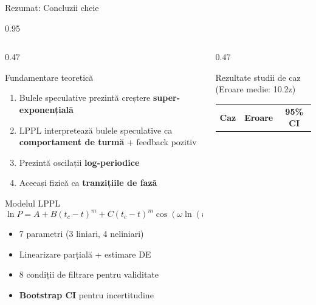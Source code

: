 \documentclass[9pt, aspectratio=169, t]{beamer}
\begin{document}
\begin{frame}{Rezumat: Concluzii cheie}
    \begin{cminipage}{0.95\textwidth}
    {\scriptsize
    \begin{columns}[T]
        \begin{column}{0.47\textwidth}
            \begin{block}{Fundamentare teoretică}
                \begin{enumerate}\setlength{\itemsep}{0pt}
                    \item Bulele speculative prezintă creștere \textbf{super-exponențială}
                    \item LPPL interpretează bulele speculative ca \textbf{comportament de turmă} + feedback pozitiv
                    \item Prezintă oscilații \textbf{log-periodice}
                    \item Aceeași fizică ca \textbf{tranzițiile de fază}
                \end{enumerate}
            \end{block}
            \vspace{-3mm}
            \begin{exampleblock}{Modelul LPPL}
                $$\ln P = A + B(t_c-t)^m + C(t_c-t)^m\cos(\omega\ln(t_c-t)-\phi)$$
                \begin{itemize}\setlength{\itemsep}{0pt}
                    \item 7 parametri (3 liniari, 4 neliniari)
                    \item Linearizare parțială + estimare DE
                    \item 8 condiții de filtrare pentru validitate
                    \item \textbf{Bootstrap CI} pentru incertitudine
                \end{itemize}
            \end{exampleblock}
        \end{column}
        \begin{column}{0.47\textwidth}
            \begin{exampleblock}{Rezultate studii de caz (Eroare medie: 10.2z)}
                {\scriptsize
                \vspace{-1mm}
                \begin{center}
                    \begin{tabular}{lcc}
                        \toprule
                        \textbf{Caz} & \textbf{Eroare} & \textbf{95\% CI} \\

\end{tabular}
\end{center}}
\end{exampleblock}
\end{column}
\end{columns}}
\end{cminipage}
\end{frame}
\end{document}

